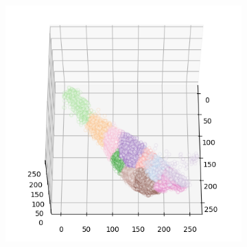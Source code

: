 \begin{figure}[htbp]
\begin{subfigure}[t]{0.32\textwidth}
    \end{subfigure}
    \begin{subfigure}[t]{0.32\textwidth}
        \includegraphics[width=\linewidth]{../../python_code/plots/kmeans/horse-170/clusters_elev60_azim0.png}
    \end{subfigure}
\end{figure}
    